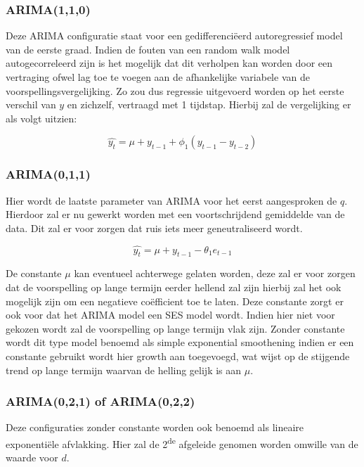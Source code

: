 \subsubsection{ARIMA(1,1,0)}

Deze ARIMA configuratie staat voor een gedifferenci\"{e}erd autoregressief model van de eerste graad. Indien de fouten van een random walk model autogecorreleerd zijn is het mogelijk dat dit verholpen kan worden door een vertraging ofwel lag toe te voegen aan de afhankelijke variabele van de voorspellingsvergelijking. Zo zou dus regressie uitgevoerd worden op het eerste verschil van $y$ en zichzelf, vertraagd met 1 tijdstap. Hierbij zal de vergelijking er als volgt uitzien:

\begin{equation}
\hat{y_t} = \mu + y_{t-1} + \phi_1 (y_{t-1} - y_{t-2})
\end{equation}

\subsubsection{ARIMA(0,1,1)}

Hier wordt de laatste parameter van ARIMA voor het eerst aangesproken de $q$. Hierdoor zal er nu gewerkt worden met een voortschrijdend gemiddelde van de data. Dit zal er voor zorgen dat ruis iets meer geneutraliseerd wordt.

\begin{equation}
\hat{y_t} = \mu + y_{t-1} - \theta_1 e_{t-1}
\end{equation}

De constante $\mu$ kan eventueel achterwege gelaten worden, deze zal er voor zorgen dat de voorspelling op lange termijn eerder hellend zal zijn hierbij zal het ook mogelijk zijn om een negatieve co\"{e}fficient toe te laten. Deze constante zorgt er ook voor dat het ARIMA model een SES model wordt. Indien hier niet voor gekozen wordt zal de voorspelling op lange termijn vlak zijn. Zonder constante wordt dit type model benoemd als simple exponential smoothening indien er een constante gebruikt wordt hier growth aan toegevoegd, wat wijst op de stijgende trend op lange termijn waarvan de helling gelijk is aan $\mu$.

\subsubsection{ARIMA(0,2,1) of ARIMA(0,2,2)}

Deze configuraties zonder constante worden ook benoemd als lineaire exponenti\"{e}le afvlakking. Hier zal de 2\textsuperscript{de} afgeleide genomen worden omwille van de waarde voor $d$. 


